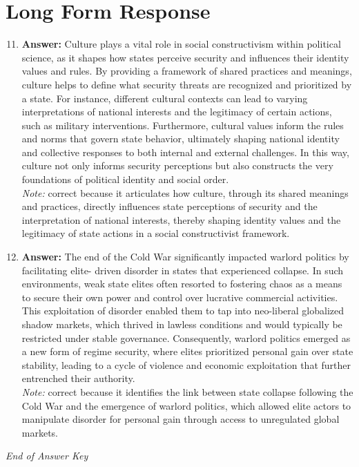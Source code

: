 \documentclass[12pt]{article}
\begin{document}
\section*{Long Form Response}
\begin{enumerate}[label=\arabic*.]
\setcounter{enumi}{10}
\item \textbf{Answer:} Culture plays a vital role in social constructivism within political science, as it shapes how states perceive security and influences their identity values and rules. By providing a framework of shared practices and meanings, culture helps to define what security threats are recognized and prioritized by a state. For instance, different cultural contexts can lead to varying interpretations of national interests and the legitimacy of certain actions, such as military interventions. Furthermore, cultural values inform the rules and norms that govern state behavior, ultimately shaping national identity and collective responses to both internal and external challenges. In this way, culture not only informs security perceptions but also constructs the very foundations of political identity and social order.
\\ \textit{Note:} correct because it articulates how culture, through its shared meanings and practices, directly influences state perceptions of security and the interpretation of national interests, thereby shaping identity values and the legitimacy of state actions in a social constructivist framework.
\item \textbf{Answer:} The end of the Cold War significantly impacted warlord politics by facilitating elite- driven disorder in states that experienced collapse. In such environments, weak state elites often resorted to fostering chaos as a means to secure their own power and control over lucrative commercial activities. This exploitation of disorder enabled them to tap into neo-liberal globalized shadow markets, which thrived in lawless conditions and would typically be restricted under stable governance. Consequently, warlord politics emerged as a new form of regime security, where elites prioritized personal gain over state stability, leading to a cycle of violence and economic exploitation that further entrenched their authority.
\\ \textit{Note:} correct because it identifies the link between state collapse following the Cold War and the emergence of warlord politics, which allowed elite actors to manipulate disorder for personal gain through access to unregulated global markets.
\end{enumerate}

\vfill
\noindent\textit{End of Answer Key}
\end{document}
